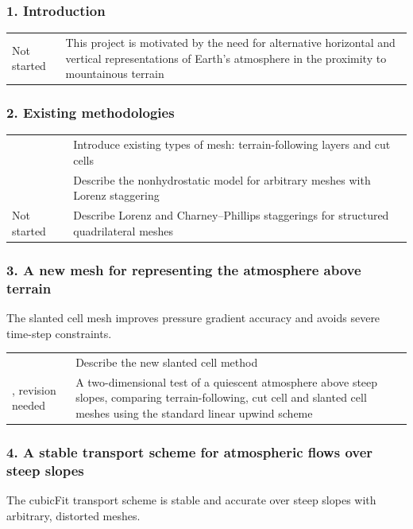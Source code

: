 \documentclass[a4paper,11pt]{article}
\begin{document}
\subsubsection*{1. Introduction}
\begin{tabularx}{\linewidth}{>{\hsize=1.3in}X X}
Not started & This project is motivated by the need for alternative horizontal and vertical representations of Earth's atmosphere in the proximity to mountainous terrain
\end{tabularx}

\subsubsection*{2. Existing methodologies}

\begin{tabularx}{\linewidth}{>{\hsize=1.3in}X X}
\citet{shaw-weller2016} & Introduce existing types of mesh: terrain-following layers and cut cells \\
\cite{shaw-weller2016} & Describe the nonhydrostatic model for arbitrary meshes with Lorenz staggering\\
Not started & Describe Lorenz and Charney--Phillips staggerings for structured quadrilateral meshes \\
\end{tabularx}

\subsubsection*{3. A new mesh for representing the atmosphere above terrain}
\noindent The slanted cell mesh improves pressure gradient accuracy and avoids severe time-step constraints.
\vspace*{0.5em}

\begin{tabularx}{\linewidth}{>{\hsize=1.3in}X X}
\citet{shaw-weller2016,shaw2017} & Describe the new slanted cell method \\
\addlinespace[0.5em]
\citet{shaw-weller2016}, revision needed & A two-dimensional test of a quiescent atmosphere above steep slopes, comparing terrain-following, cut cell and slanted cell meshes using the standard linear upwind scheme \\
\end{tabularx}

\subsubsection*{4. A stable transport scheme for atmospheric flows over steep slopes}
\noindent The cubicFit transport scheme is stable and accurate over steep slopes with arbitrary, distorted meshes.
\vspace*{0.5em}
\end{document}
